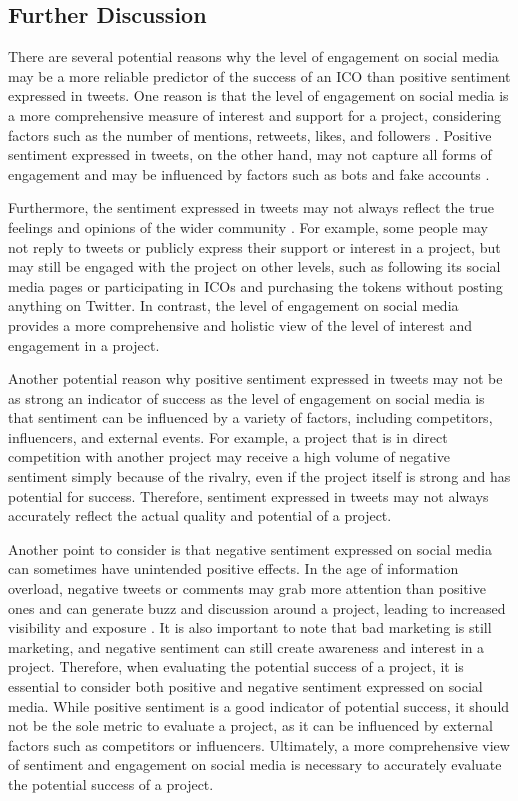 \documentclass[runningheads]{llncs}
\begin{document}
\subsection{Further Discussion}

There are several potential reasons why the level of engagement on social media may be a more reliable predictor of the success of an ICO than positive sentiment expressed in tweets. One reason is that the level of engagement on social media is a more comprehensive measure of interest and support for a project, considering factors such as the number of mentions, retweets, likes, and followers \cite{albrecht2019sentiment}. Positive sentiment expressed in tweets, on the other hand, may not capture all forms of engagement and may be influenced by factors such as bots and fake accounts \cite{mirtaheri2021identifying}.

Furthermore, the sentiment expressed in tweets may not always reflect the true feelings and opinions of the wider community \cite{fi12030060}. For example, some people may not reply to tweets or publicly express their support or interest in a project, but may still be engaged with the project on other levels, such as following its social media pages or participating in ICOs and purchasing the tokens without posting anything on Twitter. In contrast, the level of engagement on social media provides a more comprehensive and holistic view of the level of interest and engagement in a project.

Another potential reason why positive sentiment expressed in tweets may not be as strong an indicator of success as the level of engagement on social media is that sentiment can be influenced by a variety of factors, including competitors, influencers, and external events. For example, a project that is in direct competition with another project may receive a high volume of negative sentiment simply because of the rivalry, even if the project itself is strong and has potential for success. Therefore, sentiment expressed in tweets may not always accurately reflect the actual quality and potential of a project.

Another point to consider is that negative sentiment expressed on social media can sometimes have unintended positive effects. In the age of information overload, negative tweets or comments may grab more attention than positive ones and can generate buzz and discussion around a project, leading to increased visibility and exposure \cite{freeman2018enhancing}. It is also important to note that bad marketing is still marketing, and negative sentiment can still create awareness and interest in a project. Therefore, when evaluating the potential success of a project, it is essential to consider both positive and negative sentiment expressed on social media. While positive sentiment is a good indicator of potential success, it should not be the sole metric to evaluate a project, as it can be influenced by external factors such as competitors or influencers. Ultimately, a more comprehensive view of sentiment and engagement on social media is necessary to accurately evaluate the potential success of a project.
\end{document}
